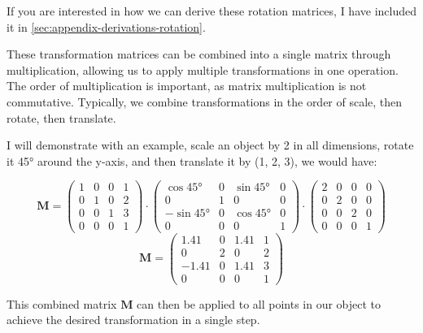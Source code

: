 \documentclass[12pt]{article}
\begin{document}
If you are interested in how we can derive these rotation matrices, I have included it in \autoref{sec:appendix-derivations-rotation}.

These transformation matrices can be combined into a single matrix through multiplication, allowing us to apply multiple transformations in one operation. The order of multiplication is important, as matrix multiplication is not commutative. Typically, we combine transformations in the order of scale, then rotate, then translate.

I will demonstrate with an example, scale an object by 2 in all dimensions, rotate it 45° around the y-axis, and then translate it by (1, 2, 3), we would have:

\[
    \mathbf{M} =
    \begin{pmatrix}
        1 & 0 & 0 & 1 \\
        0 & 1 & 0 & 2 \\
        0 & 0 & 1 & 3 \\
        0 & 0 & 0 & 1
    \end{pmatrix} \cdot
    \begin{pmatrix}
        \cos 45°  & 0 & \sin 45° & 0 \\
        0         & 1 & 0        & 0 \\
        -\sin 45° & 0 & \cos 45° & 0 \\
        0         & 0 & 0        & 1
    \end{pmatrix} \cdot
    \begin{pmatrix}
        2 & 0 & 0 & 0 \\
        0 & 2 & 0 & 0 \\
        0 & 0 & 2 & 0 \\
        0 & 0 & 0 & 1
    \end{pmatrix}
\]
\[
    \mathbf{M} = \begin{pmatrix}
        1.41  & 0 & 1.41 & 1 \\
        0     & 2 & 0    & 2 \\
        -1.41 & 0 & 1.41 & 3 \\
        0     & 0 & 0    & 1
    \end{pmatrix}
\]

This combined matrix $\mathbf{M}$ can then be applied to all points in our object to achieve the desired transformation in a single step.
\end{document}
